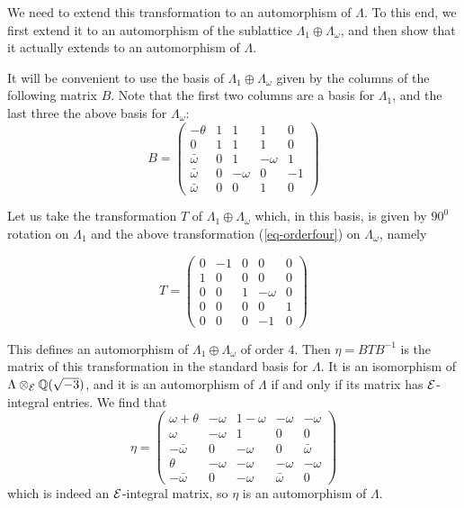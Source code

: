 We need to extend this transformation to an automorphism of $\Lambda$. To this end, we
first extend it to an automorphism of the sublattice $\Lambda_1\oplus\Lambda_\omega$,
and then show that it actually extends to an automorphism of $\Lambda$.

It will be convenient to use the basis of $\Lambda_1\oplus\Lambda_\omega$ given by the
columns of the following matrix $B$. Note that the first two columns are a basis for
$\Lambda_1$, and the last three the above basis for $\Lambda_\omega$: \begin{equation}
\label{eq-basis} B = \left(\begin{array}{ccccc} -\theta & 1 & 1 & 1 & 0 \\0 & 1 & 1 & 1
& 0 \\\bar\omega & 0 & 1 & -\omega & 1 \\ \bar\omega & 0 & -\omega & 0 & -1 \\
\bar\omega & 0 & 0 & 1 & 0\end{array}\right) \end{equation}

 Let us take the transformation $T$ of $\Lambda_1\oplus\Lambda_\omega$ which, in this
basis, is given by $90^0$ rotation on $\Lambda_1$ and the above transformation
(\ref{eq-orderfour}) on $\Lambda_\omega$, namely

\begin{equation}
\label{eq-splittransformation} T = \left(\begin{array}{ccccc}0 & -1 & 0 & 0 & 0 \\ 1 &
0 & 0 & 0 & 0 \\0 & 0 & 1 & -\omega & 0 \\0 & 0 & 0 & 0 & 1 \\0 & 0 & 0 & -1 &
0\end{array}\right) \end{equation}

This defines an automorphism of
$\Lambda_1\oplus\Lambda_\omega$ of order $4$. Then $\eta = BTB^{-1}$ is the matrix of
this transformation in the standard basis for $\Lambda$. It is an isomorphism of
$\Lambda\otimes_{ \mathcal E } { \mathbb Q }(\sqrt{-3})$, and it is an automorphism of $\Lambda$ if and
only if its matrix has ${ \mathcal E }$- integral entries. We find that \begin{equation}
\label{eq-integrality} \eta = \left(\begin{array}{ccccc} \omega + \theta & -\omega &
1-\omega & -\omega & -\omega \\ \omega & -\omega & 1 & 0 & 0 \\ -\bar\omega & 0 &
-\omega & 0 & \bar\omega \\ \theta & -\omega & -\omega & -\omega & -\omega \\
-\bar\omega & 0 & -\omega & \bar\omega & 0\end{array}\right) \end{equation} which is
indeed an ${ \mathcal E }$-integral matrix, so $\eta$ is an automorphism of $\Lambda$.

